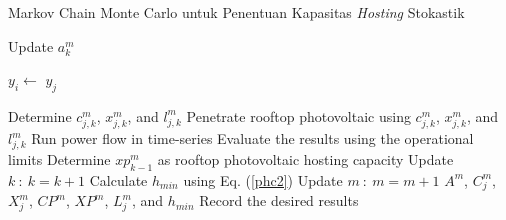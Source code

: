 \begin{algorithm}[!t]
	\caption{Markov Chain Monte Carlo untuk Penentuan Kapasitas \textit{Hosting} Stokastik}
	\begin{algorithmic}[1]
		\State Update $a^m_k$
		\EndIf	

		\State $y_i \gets$ $y_j$

		\State{}
		\State Determine $c^m_{j,k}$, $x^m_{j,k}$, and $l^m_{j,k}$ 
		\EndIf	
		\State Penetrate rooftop photovoltaic using $c^m_{j,k}$, $x^m_{j,k}$, and $l^m_{j,k}$
		\State Run power flow in time-series
		\State Evaluate the results using the operational limits
		\State Determine $\mathit{xp^m_{k-\text{1}}}$ as rooftop photovoltaic hosting capacity
		\EndIf		
		\State Update $k\ :\ k=k+1$
		\EndWhile
		\State Calculate $\mathit{h_{min}}$ using Eq. (\ref{phc2})
		\State Update $m\ :\ m=m+1$
		\EndWhile		
		\State\Return $\mathit{A^m}$, $\mathit{C^m_j}$, $\mathit{X^m_j}$, $\mathit{CP^m}$, $\mathit{XP^m}$, $\mathit{L^m_j}$, and $\mathit{h_{min}}$
		\State Record the desired results
		\EndFunction
	\end{algorithmic}
\end{algorithm}
\egroup

